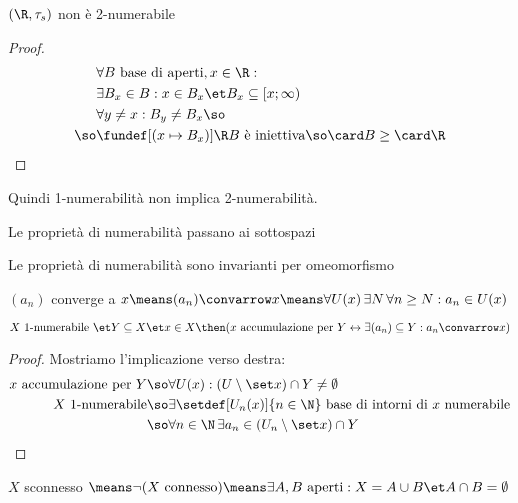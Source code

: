 \begin{prop}
$(\R,\tau_s)$ non è 2-numerabile
\end{prop}
\begin{proof}
\begin{align*}
&\forall B\text{ base di aperti},x\in\R:\\
&\exists B_x\in B:x\in B_x\et B_x\subseteq [x;\infty)\\
&\forall y\neq x:B_y\neq B_x\so\\
\so&\fundef[(x\mapsto B_x)]\R B\text{ è iniettiva}\so\card B\geq\card\R
\end{align*}
\end{proof}

\begin{oss}
Quindi 1-numerabilità non implica 2-numerabilità.
\end{oss}

\begin{prop}
Le proprietà di numerabilità passano ai sottospazi
\end{prop}

\begin{prop}
Le proprietà di numerabilità sono invarianti per omeomorfismo
\end{prop}

\begin{defn}[Convergenza]
$(a_n)$ converge a $x\means(a_n)\convarrow x\means\forall U(x)\,\exists N\,\forall n\geq N:a_n\in U(x)$
\end{defn}

\begin{prop}
$X\text{ 1-numerabile }\et Y\subseteq X\et x\in X\then(x\text{ accumulazione per }Y\leftrightarrow\exists(a_n)\subseteq Y:a_n\convarrow x)$
\end{prop}
\begin{proof}
Mostriamo l'implicazione verso destra:
\begin{align*}
x\text{ accumulazione per }Y\so&\forall U(x):(U\setminus\set x)\cap Y\neq\emptyset\\
X\text{ 1-numerabile}\so&\exists\setdef[U_n(x)]{n\in\N}\text{ base di intorni di }x\text{ numerabile}\\
\so&\forall n\in\N\,\exists a_n\in(U_n\setminus\set x)\cap Y
\end{align*}
\end{proof}

\begin{defn}[Connessione]
$X$ sconnesso $\means\neg(X\text{ connesso})\means\exists A,B\text{ aperti}:X=A\cup B\et A\cap B=\emptyset$
\end{defn}

